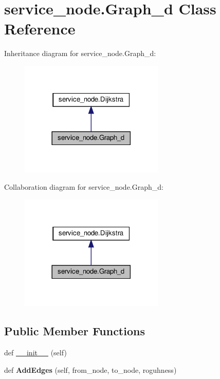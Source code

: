 \hypertarget{classservice__node_1_1Graph__d}{}\section{service\+\_\+node.\+Graph\+\_\+d Class Reference}
\label{classservice__node_1_1Graph__d}


Inheritance diagram for service\+\_\+node.\+Graph\+\_\+d\+:
\nopagebreak
\begin{figure}[H]
\begin{center}
\leavevmode
\includegraphics[width=194pt]{classservice__node_1_1Graph__d__inherit__graph}
\end{center}
\end{figure}


Collaboration diagram for service\+\_\+node.\+Graph\+\_\+d\+:
\nopagebreak
\begin{figure}[H]
\begin{center}
\leavevmode
\includegraphics[width=194pt]{classservice__node_1_1Graph__d__coll__graph}
\end{center}
\end{figure}
\subsection*{Public Member Functions}
\begin{DoxyCompactItemize}
\item 
def \hyperlink{classservice__node_1_1Graph__d_a76ed82f1e5e08fb2fbd979a1c7a988ee}{\+\_\+\+\_\+init\+\_\+\+\_\+} (self)
\item 
\mbox{\label{classservice__node_1_1Graph__d_adaf7f491fe653300d1ccfac05ee36eff}} 
def {\bfseries Add\+Edges} (self, from\+\_\+node, to\+\_\+node, roguhness)
\end{DoxyCompactItemize}
